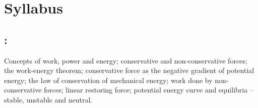 
\thispagestyle{empty}

\section*{Syllabus}

    \subsection*{\topicSubTitle: \topicTitle}
        Concepts of work, power and energy; conservative and non-conservative forces; the work-energy theorem; conservative force as the negative gradient of potential energy; the law of conservation of mechanical energy; work done by non-conservative forces; linear restoring force; potential energy curve and equilibria -- stable, unstable and neutral.
        
\setcounter{page}{1}